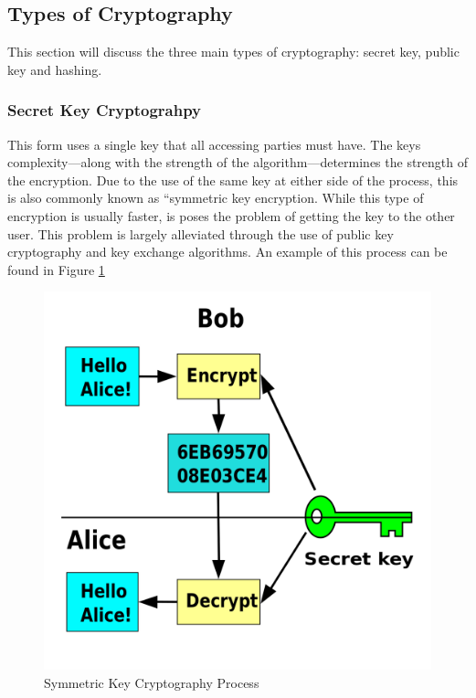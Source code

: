 \documentclass[a4paper,11pt]{report}
\begin{document}
		\subsection{Types of Cryptography}
			This section will discuss the three main types of cryptography: secret key, public key and hashing. 
			\subsubsection{Secret Key Cryptograhpy}
				This form uses a single key that all accessing parties must have. 
				The keys complexity---along with the strength of the algorithm---determines the strength of the encryption.
				Due to the use of the same key at either side of the process, this is also commonly known as ``symmetric key encryption. 
				While this type of encryption is usually faster, is poses the problem of getting the key to the other user. 
				This problem is largely alleviated through the use of public key cryptography and key exchange algorithms.
				An example of this process can be found in Figure \ref{fig:SymmetricKey}
				\begin{figure}[htb]
					\centering
					\includegraphics[scale=0.25]{./SymmetricKey.png}
					\caption{Symmetric Key Cryptography Process}
					\label{fig:SymmetricKey}
				\end{figure}
\end{document}
